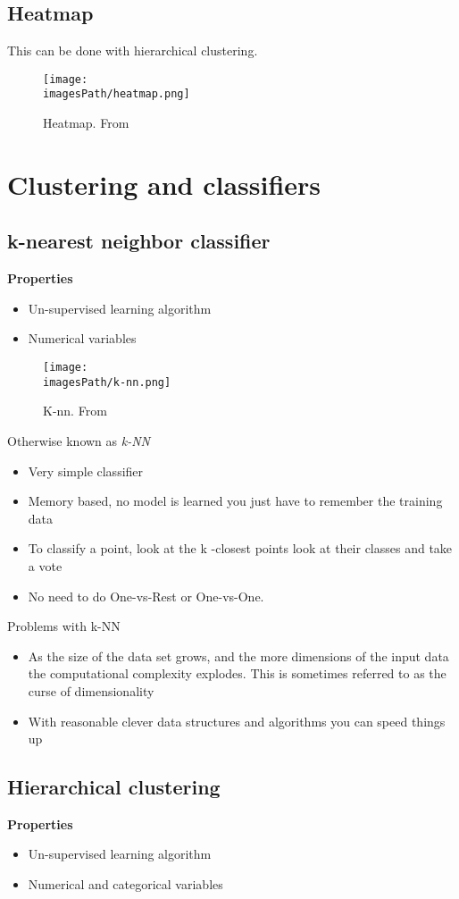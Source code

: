 \subsection{Heatmap}
This can be done with hierarchical clustering.
\begin{figure}[!h]
    \centering
    \texttt{[image: \\imagesPath/heatmap.png]}
    \caption{Heatmap. From \cite{}}
\end{figure}


\section{Clustering and classifiers}
\subsection{k-nearest neighbor classifier}
\textbf{Properties}
\begin{itemize}
    \item Un-supervised learning algorithm
    \item Numerical variables 
\end{itemize}
\begin{figure}[!h]
    \centering
    \texttt{[image: \\imagesPath/k-nn.png]}
    \caption{K-nn. From \cite{}}
\end{figure}


Otherwise known as \textit{k-NN}
\begin{itemize}
    \item Very simple classifier
    \item Memory based, no model is learned you just have to remember the
training data
    \item To classify a point, look at the k -closest points look at their classes
and take a vote
    \item No need to do One-vs-Rest or One-vs-One.
\end{itemize}

Problems with k-NN
\begin{itemize}
    \item As the size of the data set grows, and the more dimensions of the
    input data the computational complexity explodes. This is sometimes
    referred to as the curse of dimensionality
    \item With reasonable clever data structures and algorithms you can speed
things up
\end{itemize}


\subsection{Hierarchical clustering}
\textbf{Properties}
\begin{itemize}
    \item Un-supervised learning algorithm
    \item Numerical and categorical variables 
\end{itemize}

